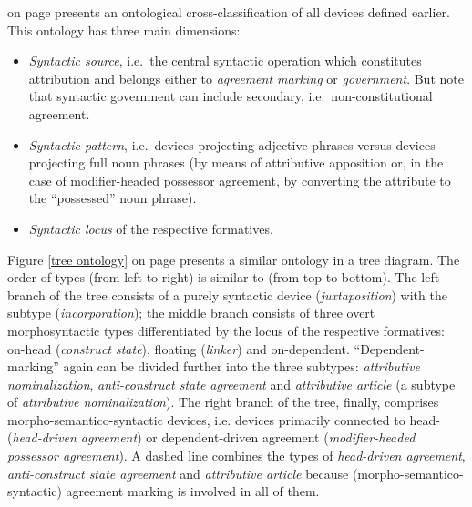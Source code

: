  on page \pageref{syntaxontology} presents an ontological cross-classification of all devices defined earlier. This ontology has three main dimensions: 
\begin{itemize}
\item\textit{Syntactic source}, i.e.~the central syntactic operation which constitutes attribution and belongs either to \textit{agreement marking} or \textit{government}. But note that syntactic government can include secondary, i.e.~non-constitutional agreement.
\item\textit{Syntactic pattern}, i.e.~devices projecting adjective phrases versus devices projecting full noun phrases (by means of attributive apposition or, in the case of modifier-headed possessor agreement, by converting the attribute to the “possessed” noun phrase).
\item\textit{Syntactic locus} of the respective formatives.
\end{itemize}
Figure \ref{tree ontology} on page \pageref{tree ontology} presents a similar ontology in a tree diagram. The order of types (from left to right) is similar to  (from top to bottom). The left branch of the tree consists of a purely syntactic device (\textit{juxtaposition}) with the subtype (\textit{incorporation}); the middle branch consists of three overt morphosyntactic types differentiated by the locus of the respective formatives: on-head (\textit{construct state}), floating (\textit{linker}) and on-dependent. “Dependent-marking” again can be divided further into the three subtypes: \textit{attributive nominalization}, \textit{anti-construct state agreement} and \textit{attributive article} (a subtype of \textit{attributive nominalization}). The right branch of the tree, finally, comprises morpho-semantico-syntactic devices, i.e. devices primarily connected to head- (\textit{head-driven agreement}) or dependent-driven agreement (\textit{modifier-headed possessor agreement}). A dashed line combines the types of \textit{head-driven agreement}, \textit{anti-construct state agreement} and \textit{attributive article} because (morpho-semantico-syntactic) agreement marking is involved in all of them.

